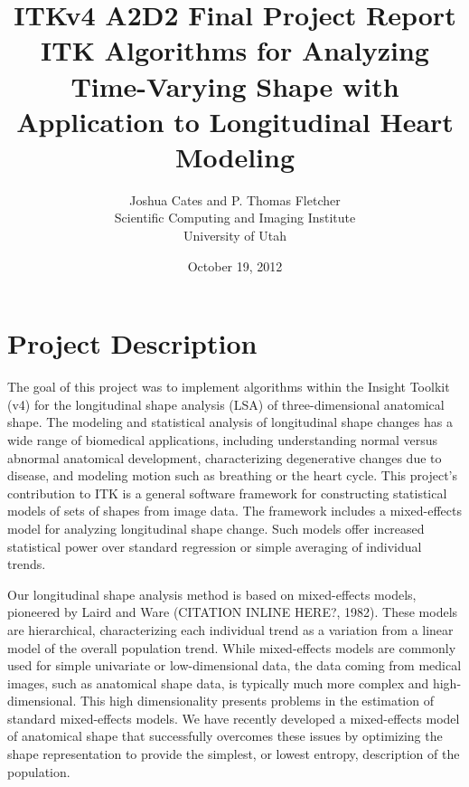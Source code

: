 \documentclass[11pt]{article}
\begin{document}
\title{ITKv4 A2D2 Final Project Report\\ {\Large ITK Algorithms for Analyzing Time-Varying Shape with Application to
  Longitudinal Heart Modeling} }
\date{October 19, 2012}
\author{Joshua Cates and P. Thomas Fletcher\\Scientific Computing and
  Imaging Institute\\University of Utah}

 \maketitle
\thispagestyle{empty}
\vspace*{-24pt} 

\section{Project Description}
The goal of this project was to implement algorithms within the
Insight Toolkit (v4) for the longitudinal shape analysis (LSA) of
three-dimensional anatomical shape. The modeling and statistical
analysis of longitudinal shape changes has a wide range of biomedical
applications, including understanding normal versus abnormal
anatomical development, characterizing degenerative changes due to
disease, and modeling motion such as breathing or the heart
cycle. This project's contribution to ITK is a general software
framework for constructing statistical models of sets of shapes from
image data. The framework includes a mixed-effects model for analyzing
longitudinal shape change. Such models offer increased statistical
power over standard regression or simple averaging of individual
trends. 

Our longitudinal shape analysis method is based on mixed-effects
models, pioneered by Laird and Ware (CITATION INLINE HERE?,
1982). These models are hierarchical, characterizing each individual
trend as a variation from a linear model of the overall population
trend. While mixed-effects models are commonly used for simple
univariate or low-dimensional data, the data coming from medical
images, such as anatomical shape data, is typically much more complex
and high-dimensional. This high dimensionality presents problems in
the estimation of standard mixed-effects models. We have recently
developed a mixed-effects model of anatomical shape that successfully
overcomes these issues by optimizing the shape representation to
provide the simplest, or lowest entropy, description of the
population.
\end{document}
